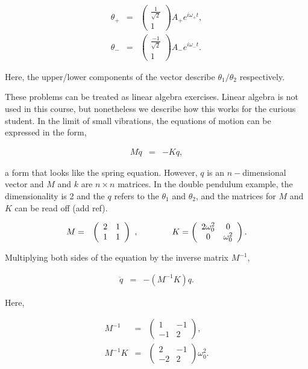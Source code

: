 \documentclass[%
oneside,                 %
final,                   %
10pt]{article}
\begin{document}
\begin{eqnarray*}
\theta_+&=&\left(\begin{array}{c}
\frac{1}{\sqrt{2}}\\ 1\end{array}\right)A_+e^{i\omega_+t},\\
\theta_-&=&\left(\begin{array}{c}
\frac{-1}{\sqrt{2}}\\ 1\end{array}\right)A_-e^{i\omega_-t}.
\end{eqnarray*}

Here, the upper/lower components of the vector describe
$\theta_1/\theta_2$ respectively.

These problems can be treated as linear algebra exercises. Linear
algebra is not used in this course, but nonetheless we describe how
this works for the curious student. In the limit of small vibrations,
the equations of motion can be expressed in the form,

\begin{eqnarray*}
M\ddot{q}&=&-Kq,
\end{eqnarray*}

a form that looks like the spring equation. However, $q$ is an
$n-$dimensional vector and $M$ and $k$ are $n\times n$ matrices. In
the double pendulum example, the dimensionality is 2 and the $q$
refers to the $\theta_1$ and $\theta_2$, and the matrices for $M$ and
$K$ can be read off (add ref).

\begin{eqnarray*}
M&=&\left(\begin{array}{cc}
2&1\\
1&1\end{array}\right)~,\hspace*{40pt} K=\left(\begin{array}{cc}
2\omega_0^2&0\\
0&\omega_0^2\end{array}\right).
\end{eqnarray*}

Multiplying both sides of the equation by the inverse matrix $M^{-1}$,

\begin{eqnarray*}
\ddot{q}&=&-\left(M^{-1}K\right)q.
\end{eqnarray*}

Here,

\begin{eqnarray*}
M^{-1}&=&\left(\begin{array}{cc}
1&-1\\
-1&2\end{array}\right),\\
M^{-1}K&=&\left(\begin{array}{cc}
2&-1\\
-2&2\end{array}\right)\omega_0^2.
\end{eqnarray*}
\end{document}
